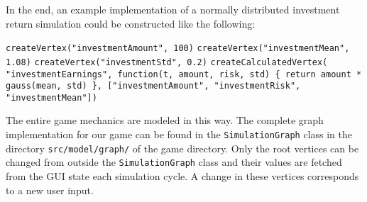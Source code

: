  
 
 In the end, an example implementation of a normally distributed investment return simulation could be constructed like the following:\\
 
 \begin{algorithmic}[1]
 	\STATE \texttt{createVertex("investmentAmount", 100)}
    \STATE \texttt{createVertex("investmentMean", 1.08)}
    \STATE \texttt{createVertex("investmentStd", 0.2)}
	\STATE \texttt{createCalculatedVertex(\newline \hspace*{1mm} "investmentEarnings",\newline \hspace*{2mm} function(t, amount, risk, std) \{ \newline \hspace*{10mm}return amount * gauss(mean, std)  \newline \hspace*{2mm} \},\newline \hspace*{2mm} ["investmentAmount", "investmentRisk", "investmentMean"]\newline )}    
  \end{algorithmic}
  \vspace{1cm}
  The entire game mechanics are modeled in this way. The complete graph implementation for our game can be found in the \texttt{SimulationGraph} class in the directory \texttt{src/model/graph/} of the game directory. Only the root vertices can be changed from outside the \texttt{SimulationGraph} class and their values are fetched from the GUI state each simulation cycle. A change in these vertices corresponds to a new user input.